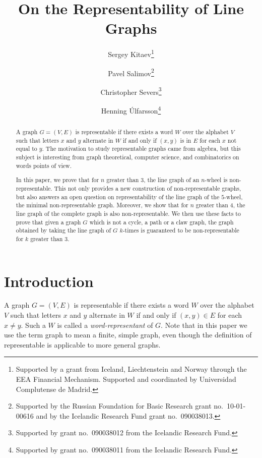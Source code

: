 \documentclass[12pt]{article}
\title{On the Representability of Line Graphs}
\author{Sergey Kitaev\thanks{Supported by a grant from Iceland, Liechtenstein and Norway through the EEA Financial Mechanism. Supported and coordinated by Universidad Complutense de Madrid.}
\and
Pavel Salimov\thanks{Supported by the Russian Foundation for Basic Research grant no.\ 10-01-00616 and by the Icelandic Research Fund grant no.\ 090038013.}
\and
Christopher Severs\thanks{Supported by grant no.\ 090038012 from the Icelandic Research Fund.}
\and
Henning \'Ulfarsson\thanks{Supported by grant no.\ 090038011 from the Icelandic Research Fund.}}
\begin{document}
\maketitle

\begin{abstract}

A graph $G=(V,E)$ is representable if there exists a word $W$ over the alphabet $V$ such that letters $x$ and $y$ alternate in $W$ if and only if $(x,y)$ is in $E$ for each $x$ not equal to $y$. The motivation to study representable graphs came from algebra, but this subject is interesting from graph theoretical, computer science, and combinatorics on words points of view.


In this paper, we prove that for $n$ greater than $3$, the line graph of an $n$-wheel is non-representable. This not only provides a new construction of non-representable graphs, but also answers an open question on representability of the line graph of the $5$-wheel, the minimal non-representable graph. Moreover, we show that for $n$ greater than $4$, the line graph of the complete graph is also non-representable. We then use these facts to prove that given a graph $G$ which is not a cycle, a path or a claw graph, the graph obtained by taking the line graph of $G$ $k$-times is guaranteed to be non-representable for $k$ greater than $3$.

\end{abstract}

\section{Introduction}

A graph $G=(V,E)$ is representable if there exists a word $W$ over
the alphabet $V$ such that letters $x$ and $y$ alternate in $W$ if
and only if $(x,y)\in E$ for each $x\neq y$. Such a $W$ is called a {\em word-representant} of $G$. Note that in this paper we use the term graph to mean a finite, simple graph, even though the definition of representable is applicable to more general graphs. 
\end{document}
